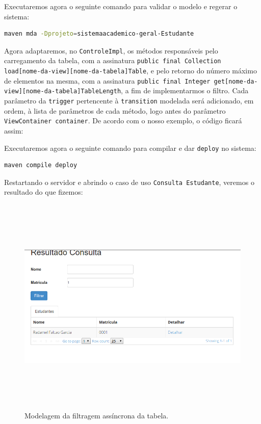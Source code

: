 Executaremos agora o seguinte comando para validar o modelo e regerar o
sistema:
\begin{lstlisting}[language=bash, frame=single, breaklines=true]
maven mda -Dprojeto=sistemaacademico-geral-Estudante
\end{lstlisting}

Agora adaptaremos, no \texttt{ControleImpl}, os métodos responsáveis pelo
carregamento da tabela, com a assinatura \texttt{public final Collection
load[nome-da-view][nome-da-tabela]Table}, e pelo retorno do número máximo de
elementos na mesma, com a assinatura \texttt{public final Integer
get[nome-da-view][nome-da-tabela]TableLength}, a fim de implementarmos o filtro.
Cada parâmetro da \texttt{trigger} pertencente à \texttt{transition} modelada
será adicionado, em ordem, à lista de parâmetros de cada método, logo antes do
parâmetro \texttt{ViewContainer container}. De acordo com o nosso exemplo, o
código ficará assim:


Executaremos agora o seguinte comando para compilar e dar \texttt{deploy} no
sistema:
\begin{lstlisting}[language=bash, frame=single, breaklines=true]
maven compile deploy
\end{lstlisting}

Restartando o servidor e abrindo o caso de uso \texttt{Consulta Estudante},
veremos o resultado do que fizemos:
\begin{figure}[H]
	\centering
	\includegraphics[width=340pt,height=300pt]{files/imgs/tutorial-mdarte-0042.png}
	\caption{Modelagem da filtragem assíncrona da tabela.}
	\label{modelando_filtragem_assincrona}
\end{figure}